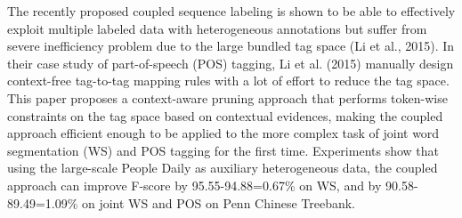 The recently proposed coupled sequence labeling is shown to be able to effectively exploit multiple labeled data with heterogeneous annotations but suffer from severe inefficiency problem due to the large bundled tag space (Li et al., 2015). In their case study of part-of-speech (POS) tagging,  Li et al. (2015) manually design context-free tag-to-tag mapping rules with a lot of effort to reduce the tag space. This paper proposes a context-aware pruning approach that performs token-wise constraints on the tag space based on contextual evidences, making the coupled approach efficient enough to be applied to the more complex task of joint word segmentation (WS) and POS tagging for the first time. Experiments show that using the large-scale People Daily as auxiliary heterogeneous data, the coupled approach can improve F-score by 95.55-94.88=0.67\% on WS, and by 90.58-89.49=1.09\% on joint WS and POS on Penn Chinese Treebank.

